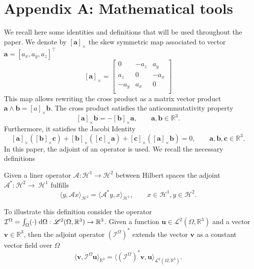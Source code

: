 \documentclass{svjour3}                     %
\newcommand{\crmat}[1]{\ensuremath{[#1]_{\times}}}
\begin{document}
\section*{Appendix A: Mathematical tools}
We recall here some identities and definitions that will be used throughout the paper. We denote by $\crmat{\bm{a}}$ the skew symmetric map associated to vector $\bm{a} = [a_x, a_y, a_z]^\top$
\begin{equation}
\crmat{\bm{a}} = 
\begin{bmatrix}
0 & -a_z & a_y \\
a_z & 0 & -a_x \\
-a_y & a_x & 0 \\
\end{bmatrix}
\end{equation}
This map allows rewriting the cross product as a matrix vector product $\bm{a}\wedge \bm{b} = \crmat{a}\bm{b}$. The cross product satisfies the anticommutativity property
\begin{equation}
\label{eq:anticom}
	 \crmat{\bm{a}} \bm{b} = - \crmat{\bm{b}} \bm{a}, \qquad \bm{a}, \bm{b} \in \mathbb{R}^3.
\end{equation}
Furthermore, it satisfies the Jacobi Identity
\begin{equation}
\label{eq:jacobi}
\crmat{\bm{a}} (\crmat{\bm{b}} \bm{c}) + \crmat{\bm{b}} (\crmat{\bm{c}} \bm{a}) + \crmat{\bm{c}} (\crmat{\bm{a}} \bm{b}) = 0, \qquad \bm{a}, \bm{b}, \bm{c} \in \mathbb{R}^3.
\end{equation}
In this paper, the adjoint of an operator is used. We recall the necessary definitions
\begin{definition}
Given a liner operator $\mathcal{A}: \mathscr{H}^1 \rightarrow \mathscr{H}^2$ between Hilbert spaces the adjoint $\mathcal{A}^*:\mathscr{H}^2\rightarrow~\mathscr{H}^1$ fulfills 
\begin{equation}
\langle y, \mathcal{A}x \rangle_{\mathscr{H}^2} = \langle \mathcal{A}^* y, x \rangle_{\mathscr{H}^1}, \qquad x \in \mathscr{H}^1, y \in \mathscr{H}^2.
\end{equation}
\end{definition}
To illustrate this definition consider the operator $\mathcal{I}^\Omega = \int_\Omega (\cdot) \d\Omega : \mathscr{L}^2(\Omega, \mathbb{R}^3) \rightarrow \mathbb{R}^3$. Given a function $\bm{u} \in \mathscr{L}^2(\Omega, \mathbb{R}^3)$ and a vector $\bm{v} \in \mathbb{R}^3$, then the adjoint operator $(\mathcal{I}^\Omega)^*$ extends the vector $\bm{v}$ as a constant vector field over $\Omega$
\begin{equation*} 
	\langle \bm{v}, \mathcal{I}^\Omega \bm{u} \rangle_{\mathbb{R}^3} = \langle (\mathcal{I}^\Omega)^* \bm{v},  \bm{u} \rangle_{\mathscr{L}^2(\Omega, \mathbb{R}^3)}. 
\end{equation*}
\end{document}
